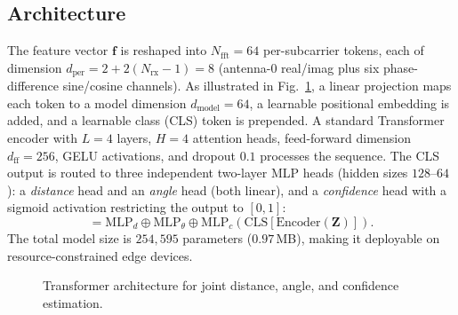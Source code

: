 \documentclass[conference]{IEEEtran}
\begin{document}
\subsection{Architecture}
The feature vector $\mathbf{f}$ is reshaped into $N_{\mathrm{fft}}=64$
per-subcarrier tokens, each of dimension
$d_{\mathrm{per}} = 2 + 2(N_{\mathrm{rx}}-1) = 8$ (antenna-0 real/imag plus
six phase-difference sine/cosine channels). As illustrated in
Fig.~\ref{fig:arch}, a linear projection maps each token to a model dimension
$d_{\mathrm{model}}=64$, a learnable positional embedding is added, and a
learnable class (CLS) token is prepended. A standard Transformer encoder with
$L=4$ layers, $H=4$ attention heads, feed-forward dimension $d_{\mathrm{ff}}=256$,
GELU activations, and dropout $0.1$ processes the sequence. The CLS output is
routed to three independent two-layer MLP heads (hidden sizes $128$--$64$):
a \emph{distance} head and an \emph{angle} head (both linear), and a
\emph{confidence} head with a sigmoid activation restricting the output to
$[0,1]$:
\begin{equation}
  [\hat{d},\; \hat{\theta},\; \hat{c}] = \mathrm{MLP}_{d}\oplus
    \mathrm{MLP}_{\theta}\oplus \mathrm{MLP}_{c}
    \left(\mathrm{CLS}\!\left[\mathrm{Encoder}(\mathbf{Z})\right]\right).
\label{eq:heads}
\end{equation}
The total model size is $254{,}595$ parameters ($0.97$\,MB), making it
deployable on resource-constrained edge devices.

\begin{figure}[t]
\centering
{}
\caption{Transformer architecture for joint distance, angle, and confidence
estimation.}
\label{fig:arch}
\end{figure}
\end{document}
